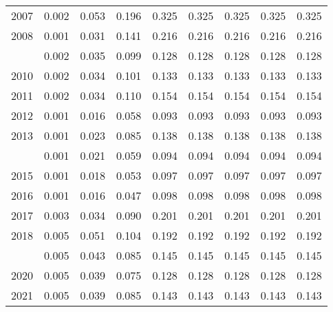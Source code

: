 \documentclass[
]{article}
\begin{document}
\begin{longtable}[t]{lrrrrrrrr}
2007 & 0.002 & 0.053 & 0.196 & 0.325 & 0.325 & 0.325 & 0.325 & 0.325\\
2008 & 0.001 & 0.031 & 0.141 & 0.216 & 0.216 & 0.216 & 0.216 & 0.216\\
\addlinespace
2009 & 0.002 & 0.035 & 0.099 & 0.128 & 0.128 & 0.128 & 0.128 & 0.128\\
2010 & 0.002 & 0.034 & 0.101 & 0.133 & 0.133 & 0.133 & 0.133 & 0.133\\
2011 & 0.002 & 0.034 & 0.110 & 0.154 & 0.154 & 0.154 & 0.154 & 0.154\\
2012 & 0.001 & 0.016 & 0.058 & 0.093 & 0.093 & 0.093 & 0.093 & 0.093\\
2013 & 0.001 & 0.023 & 0.085 & 0.138 & 0.138 & 0.138 & 0.138 & 0.138\\
\addlinespace
2014 & 0.001 & 0.021 & 0.059 & 0.094 & 0.094 & 0.094 & 0.094 & 0.094\\
2015 & 0.001 & 0.018 & 0.053 & 0.097 & 0.097 & 0.097 & 0.097 & 0.097\\
2016 & 0.001 & 0.016 & 0.047 & 0.098 & 0.098 & 0.098 & 0.098 & 0.098\\
2017 & 0.003 & 0.034 & 0.090 & 0.201 & 0.201 & 0.201 & 0.201 & 0.201\\
2018 & 0.005 & 0.051 & 0.104 & 0.192 & 0.192 & 0.192 & 0.192 & 0.192\\
\addlinespace
2019 & 0.005 & 0.043 & 0.085 & 0.145 & 0.145 & 0.145 & 0.145 & 0.145\\
2020 & 0.005 & 0.039 & 0.075 & 0.128 & 0.128 & 0.128 & 0.128 & 0.128\\
2021 & 0.005 & 0.039 & 0.085 & 0.143 & 0.143 & 0.143 & 0.143 & 0.143\\*
\end{longtable}
\end{document}
